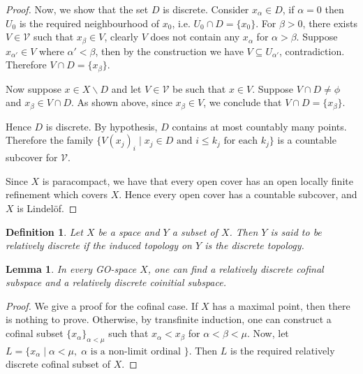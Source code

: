 \documentclass[12pt,oneside,english]{amsbook}
\numberwithin{equation}{section} %
\numberwithin{figure}{section} %
\theoremstyle{plain}
\numberwithin{section}{chapter}
\theoremstyle{plain}
\newtheorem{lem}[thm]{Lemma}
\newtheorem{defn}[thm]{Definition}
\begin{document}
\begin{proof}
  Now, we show that the set $D$ is discrete. Consider $x_{\alpha} \in D$, if $\alpha = 0$ then $U_{0}$ is the required neighbourhood of $x_0$, i.e. $U_0 \cap D = \{x_0\}$. For $\beta > 0$, there exists $V \in \mathcal{V}$ such that $x_{\beta} \in V$, clearly $V$ does not contain any $x_{\alpha}$ for $\alpha > \beta$. Suppose $x_{\alpha'} \in V$ where $\alpha' < \beta$, then by the construction we have $V \subseteq U_{\alpha'}$, contradiction. Therefore $V \cap D = \{x_{\beta}\}$.

  Now suppose $x \in X \backslash D$ and let $V \in \mathcal{V}$ be such that $x \in V$. Suppose $V \cap D \neq \phi$ and $x_{\beta} \in V \cap D$. As shown above, since $x_{\beta} \in V$, we conclude that $V \cap D = \{x_{\beta}\}$. 

   Hence $D$ is discrete. By hypothesis, $D$ contains at most countably many points. Therefore the family $\{V(x_{j})_i \; | \; x_j \in D \text{ and } i \leq k_j \text{ for each } k_j\}$ is a countable subcover for $\mathcal{V}$.

  Since $X$ is paracompact, we have that every open cover has an open locally finite refinement which covers $X$. Hence every open cover has a countable subcover, and $X$ is Lindel\"{o}f. 
\end{proof}


\begin{defn}\label{lindelof:def:13}
 Let $X$ be a space and $Y$ a subset of $X$. Then $Y$ is said to be relatively discrete if the induced topology on $Y$ is the discrete topology.
\end{defn}
\begin{lem}\label{lindelof:lem:13-1}
  In every GO-space $X$, one can find a relatively discrete cofinal subspace and a relatively discrete coinitial subspace.
\end{lem}
\begin{proof}
We give a proof for the cofinal case. If $X$ has a maximal point, then there is nothing to prove. Otherwise, by transfinite induction, one can construct a cofinal subset $\{x_{\alpha}\}_{\alpha < \mu}$ such that $x_{\alpha} < x_{\beta}$ for $\alpha < \beta < \mu$. Now, let $L = \{x_{\alpha} \; | \; \alpha < \mu, \; \alpha \text{ is a non-limit ordinal } \}$. Then $L$ is the required relatively discrete cofinal subset of $X$. 
\end{proof}
\end{document}

